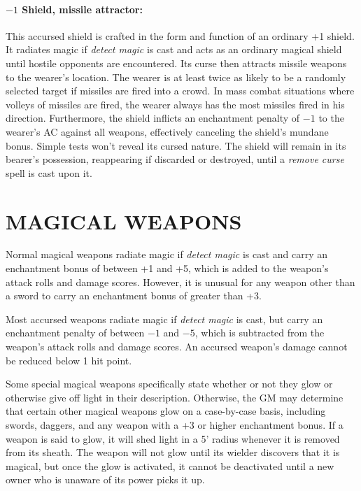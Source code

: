 \begin{multicols}{2}
\paragraph{$-1$ Shield, missile attractor:} This accursed shield is crafted in the form and function of an ordinary +1 shield.  It radiates magic if \textit{detect magic} is cast and acts as an ordinary magical shield until hostile opponents are encountered.  Its curse then attracts missile weapons to the wearer's location.  The wearer is at least twice as likely to be a randomly selected target if missiles are fired into a crowd.  In mass combat situations where volleys of missiles are fired, the wearer always has the most missiles fired in his direction. Furthermore, the shield inflicts an enchantment penalty of $-1$ to the wearer's AC against all weapons, effectively canceling the shield's mundane bonus.   Simple tests won't reveal its cursed nature.  The shield will remain in its bearer's possession, reappearing if discarded or destroyed, until a \textit{remove curse} spell is cast upon it.


 
\section{MAGICAL WEAPONS}

Normal magical weapons radiate magic if \textit{detect magic} is cast and carry an enchantment bonus of between +1 and +5, which is added to the weapon's attack rolls and damage scores. However, it is unusual for any weapon other than a sword to carry an enchantment bonus of greater than +3.  

Most accursed weapons radiate magic if \textit{detect magic} is cast, but carry an enchantment penalty of between $-1$ and $-5$, which is subtracted from the weapon's attack rolls and damage scores. An accursed weapon's damage cannot be reduced below 1 hit point.  

Some special magical weapons specifically state whether or not they glow or otherwise give off light in their description.  Otherwise, the GM may determine that certain other magical weapons glow on a case-by-case basis, including swords, daggers, and any weapon with a +3 or higher enchantment bonus.  If a weapon is said to glow, it will shed light in a 5' radius whenever it is removed from its sheath.  The weapon will not glow until its wielder discovers that it is magical, but once the glow is activated, it cannot be deactivated until a new owner who is unaware of its power picks it up.


\end{multicols}

